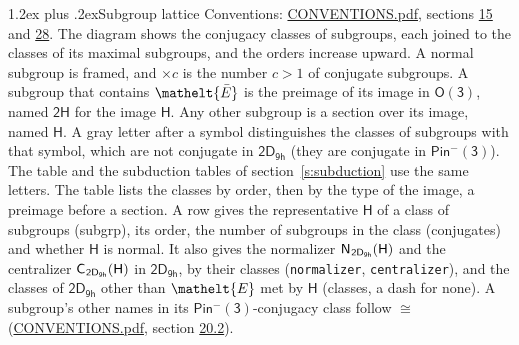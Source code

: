 \documentclass[10pt,a4paper]{article}
\makeatletter
\renewcommand\section{\@startsection{section}{1}{\z@}{-3ex plus -1ex minus -.2ex}%
  {1.2ex plus .2ex}{\normalfont\large\sffamily\bfseries\color{parttitle}}}
\numberwithin{equation}{section}
\newcommand{\eltfont}[1]{{\let\sigma\eltsigma\mathelt{#1}}}
\newcommand{\grp}[1]{\mathsf{#1}}
\newcommand{\cls}[1]{\eltfont{#1}}
\newcommand{\elt}[1]{\eltfont{#1}}
\newcommand{\samecls}{\cong}
\newcommand{\barred}[1]{\bar{#1}}
\newcommand{\hairsp}{\mkern1mu}
\makeatother
\begin{document}
\section{Subgroup lattice}\label{s:subgroups}
Conventions: \href{../../CONVENTIONS.pdf}{CONVENTIONS.pdf}, sections \href{../../../rotation/CONVENTIONS.pdf\#conv.15}{15} and \href{../../CONVENTIONS.pdf\#conv.28}{28}.
The diagram shows the conjugacy classes of subgroups, each joined to the classes of its maximal subgroups, and the orders increase upward. A normal subgroup is framed, and ${\times}c$ is the number $c > 1$ of conjugate subgroups. \label{n:group.H}A subgroup that contains $\elt{\barred{E}}$ is the preimage of its image in $\grp{O(3)}$, named $\grp{2H}$ for the image $\grp{H}$. Any other subgroup is a section over its image, named $\grp{H}$. \label{n:mark.letter}A gray letter after a symbol distinguishes the classes of subgroups with that symbol, which are not conjugate in $\grp{2D_{9h}}$ (they are conjugate in \href{Pinminus3.pdf}{$\grp{Pin^{-}(3)}$}). The table and the subduction tables of section~\ref{s:subduction} use the same letters. The table lists the classes by order, then by the type of the image, a preimage before a section. \label{n:head.subgroup}\label{n:head.order}\label{n:head.conjugates}\label{n:head.normal}A row gives the representative $\grp{H}$ of a class of subgroups (subgrp), its order, the number of subgroups in the class (conjugates) and whether $\grp{H}$ is normal. \label{n:group.normalizer}\label{n:group.centralizer}\label{n:head.classes}It also gives the normalizer $\grp{N}_{\hairsp \grp{2D_{9h}}}(\grp{H})$ and the centralizer $\grp{C}_{\hairsp \grp{2D_{9h}}}(\grp{H})$ in $\grp{2D_{9h}}$, by their classes (\texttt{normalizer}, \texttt{centralizer}), and the classes of $\grp{2D_{9h}}$ other than $\cls{E}$ met by $\grp{H}$ (classes, a dash for none). A subgroup's other names in its \href{Pinminus3.pdf}{$\grp{Pin^{-}(3)}$}-conjugacy class follow $\samecls$ (\href{../../CONVENTIONS.pdf}{CONVENTIONS.pdf}, section \href{../../CONVENTIONS.pdf\#conv.20.2}{20.2}).
\end{document}
